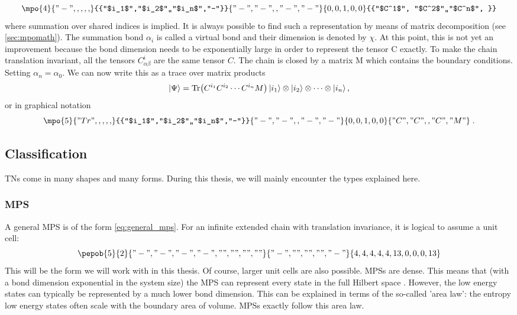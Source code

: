 \begin{equation}
    \mpo{4}{{"-",,,,,}}{{"$i_1$","$i_2$",,"$i_n$","-"}}{{"-","-",,"-","-"}}{{0,0,1,0,0}}{{"$C^1$", "$C^2$",,"$C^n$", }}
\end{equation}
where summation over shared indices is implied. It is always possible to find such a representation by means of matrix decomposition (see \cref{sec:mpomath}). The summation bond $\alpha_i$ is called a virtual bond and their dimension is denoted by $\chi$. At this point, this is not yet an improvement because the bond dimension needs to be exponentially large in order to represent the tensor C exactly. To make the chain translation invariant, all the tensors $C^i_{\alpha \beta }$ are the same tensor $C$. The chain is closed by a matrix M which contains the boundary conditions. Setting $\alpha_n = \alpha_0$. We can now write this as a trace over matrix products
\begin{equation}
    \ket{\Psi} = \Tr( C^{i_1} C^{i_2} \cdots C^{i_n} M  ) \ket{i_1} \otimes \ket{i_2} \otimes \cdots \otimes \ket{i_n},
\end{equation}
or in graphical notation
\begin{equation}\label{eq:general_mps}
    \mpo{5}{{"Tr",,,,,}}{{"$i_1$","$i_2$",,"$i_n$","-"}}{{"-","-",,"-","-"}}{{0,0,1,0,0}}{{"C", "C",,"C","M" }} \; .
\end{equation}

\subsection{Classification}

\Glspl{TN} come in many shapes and many forms. During this thesis, we will mainly encounter the types explained here.

\subsubsection{ MPS}

A general \gls{MPS} is of the form \cref{eq:general_mps}. For an infinite extended chain with translation invariance, it is logical to assume a unit cell:
\begin{equation}\label{mps:uni}
    \pepob{5}{2}{{
                "-","-", "-","-",
                "","","",""}}{{
                "-",
                "",
                "",
                "",
                "-"}}{{
                4,4,4,4,4,
                13,0,0,0,13}}
\end{equation}
This will be the form we will work with in this thesis. Of course, larger unit cells are also possible. \Glspl{MPS} are dense. This means that (with a bond dimension exponential in the system size) the \Gls{MPS} can represent every state in the full Hilbert space \cite{Orus2014}. However, the low energy states can typically be represented by a much lower bond dimension. This can be explained in terms of the so-called 'area law': the entropy low energy states often scale with the boundary area of volume. \Glspl{MPS} exactly follow this area law.

